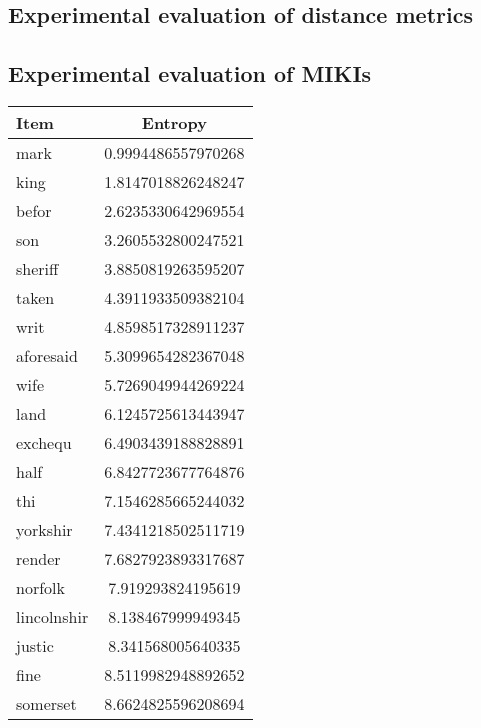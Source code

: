 \documentclass[paper=a4, fontsize=11pt]{scrartcl}
\begin{document}
\subsection{Experimental evaluation of distance metrics}

\subsection{Experimental evaluation of MIKIs}

\begin{table}
    \begin{minipage}{.5\textwidth}
        \small
        \centering
    	\begin{tabular}{l S[round-precision=4]}
    		\toprule
    		{Item} & {Entropy}\\
    		\midrule
    		mark & 0.9994486557970268\\
    		king & 1.8147018826248247\\
    		befor & 2.6235330642969554\\
    		son & 3.2605532800247521\\
    		sheriff & 3.8850819263595207\\
    		taken & 4.3911933509382104\\
    		writ & 4.8598517328911237\\
    		aforesaid & 5.3099654282367048\\
    		wife & 5.7269049944269224\\
    		land & 6.1245725613443947\\
    		exchequ & 6.4903439188828891\\
    		half & 6.8427723677764876\\
    		thi & 7.1546285665244032\\
    		yorkshir & 7.4341218502511719\\
    		render & 7.6827923893317687\\
    		norfolk & 7.919293824195619\\
    		lincolnshir & 8.138467999949345\\
    		justic & 8.341568005640335\\
    		fine & 8.5119982948892652\\
    		somerset & 8.6624825596208694\\
    		\bottomrule
    	\end{tabular}
    	\label{t:miki_finerolls}
    \end{minipage}
    \begin{minipage}{.5\textwidth}

\end{minipage}
\end{table}
\end{document}
